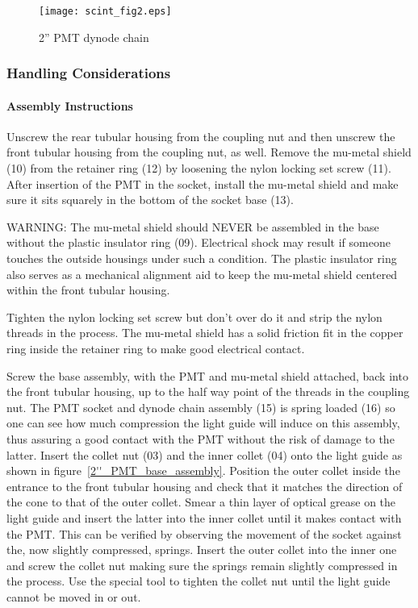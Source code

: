 \documentclass[12pt]{article}
\begin{document}
\begin{figure}
\begin{center}
\texttt{[image: scint\_fig2.eps]}
{\linespread{1.}
\caption[The 2" PMT base used in S1 and S2 trigger scintillators]{2'' PMT dynode chain}
\label{2''_PMT_dynode_chain}}
\end{center}
\end{figure}

\subsubsection{Handling Considerations}
\paragraph{Assembly Instructions}

   Unscrew the rear tubular housing from the coupling nut and then unscrew the
front tubular housing from the coupling nut, as well.  Remove the mu-metal
shield (10) from the retainer ring (12) by loosening the nylon locking set screw
(11). After insertion of the PMT in the socket, install the mu-metal shield and
make sure it sits squarely in the bottom of the socket base (13). 

WARNING: The mu-metal shield should NEVER be assembled in the base without the 
plastic insulator ring (09). Electrical shock may result if someone touches the 
outside housings under such a condition. The plastic insulator ring also serves 
as a mechanical alignment aid to keep the mu-metal shield centered within the 
front tubular housing.

Tighten the nylon locking set screw but don't over do it and strip the nylon
threads in the process. The mu-metal shield has a solid friction fit in the
copper ring inside the retainer ring to make good electrical contact. 

Screw the base assembly, with the PMT and mu-metal shield attached, back into
the front tubular housing, up to the half way point of the threads in the
coupling nut. The PMT socket and dynode chain assembly (15) is spring loaded
(16) so one can see how much compression the light guide will induce on this
assembly, thus assuring a good contact with the PMT without the risk of damage
to the latter. Insert the collet nut (03) and the inner collet (04) onto the
light guide as shown in figure~\ref{2''_PMT_base_assembly}. Position the outer collet inside the entrance
to the front tubular housing and check that it matches the direction of the
cone to that of the outer collet. Smear a thin layer of optical grease on the
light guide and insert the latter into the inner collet until it makes contact
with the PMT. This can be verified by observing the movement of the socket
against the, now slightly compressed, springs. Insert the outer collet into the
inner one and screw the collet nut making sure the springs remain slightly
compressed in the process. Use the special tool to tighten the collet nut until
the light guide cannot be moved in or out. 
\end{document}
